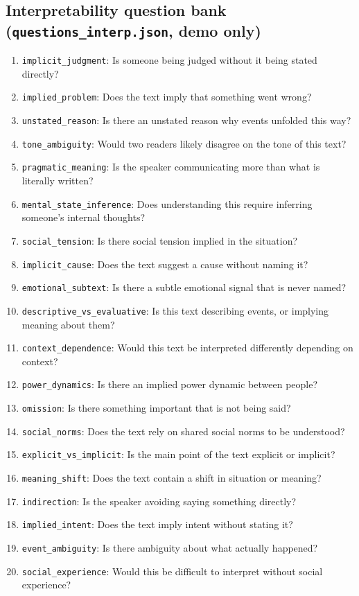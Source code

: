 \documentclass[11pt]{article}
\begin{document}
\subsection{Interpretability question bank (\texttt{questions\_interp.json}, demo only)}
\begin{enumerate}\itemsep0pt
\item \texttt{implicit\_judgment}: Is someone being judged without it being stated directly?
\item \texttt{implied\_problem}: Does the text imply that something went wrong?
\item \texttt{unstated\_reason}: Is there an unstated reason why events unfolded this way?
\item \texttt{tone\_ambiguity}: Would two readers likely disagree on the tone of this text?
\item \texttt{pragmatic\_meaning}: Is the speaker communicating more than what is literally written?
\item \texttt{mental\_state\_inference}: Does understanding this require inferring someone's internal thoughts?
\item \texttt{social\_tension}: Is there social tension implied in the situation?
\item \texttt{implicit\_cause}: Does the text suggest a cause without naming it?
\item \texttt{emotional\_subtext}: Is there a subtle emotional signal that is never named?
\item \texttt{descriptive\_vs\_evaluative}: Is this text describing events, or implying meaning about them?
\item \texttt{context\_dependence}: Would this text be interpreted differently depending on context?
\item \texttt{power\_dynamics}: Is there an implied power dynamic between people?
\item \texttt{omission}: Is there something important that is not being said?
\item \texttt{social\_norms}: Does the text rely on shared social norms to be understood?
\item \texttt{explicit\_vs\_implicit}: Is the main point of the text explicit or implicit?
\item \texttt{meaning\_shift}: Does the text contain a shift in situation or meaning?
\item \texttt{indirection}: Is the speaker avoiding saying something directly?
\item \texttt{implied\_intent}: Does the text imply intent without stating it?
\item \texttt{event\_ambiguity}: Is there ambiguity about what actually happened?
\item \texttt{social\_experience}: Would this be difficult to interpret without social experience?
\end{enumerate}
\end{document}
